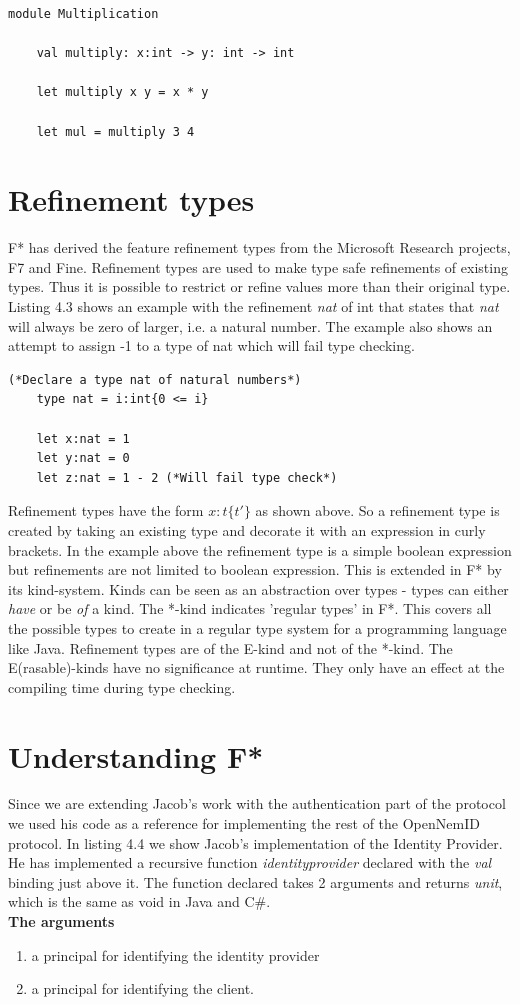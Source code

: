 \documentclass[twosided]{report}
\begin{document}
\begin{lstlisting}[style=fstar, caption={Multiplication example in F*}]
	module Multiplication

	val multiply: x:int -> y: int -> int
	
	let multiply x y = x * y
	
	let mul = multiply 3 4
\end{lstlisting}

\section{Refinement types}
F* has derived the feature refinement types from the Microsoft Research projects, F7 and Fine. Refinement types are used to make type safe refinements of existing types. Thus it is possible to restrict or refine values more than their original type. Listing 4.3 shows an example with the refinement \emph{nat} of int that states that \emph{nat} will always be zero of larger, i.e. a natural number. The example also shows an attempt to assign -1 to a type of nat which will fail type checking.
\begin{lstlisting}[style=fstar, caption={Simple refinement types in F*}]
	(*Declare a type nat of natural numbers*)	
	type nat = i:int{0 <= i}
	
	let x:nat = 1
	let y:nat = 0
	let z:nat = 1 - 2 (*Will fail type check*)
\end{lstlisting}

Refinement types have the form $x:t\{t'\}$ as shown above. So a refinement type is created by taking an existing type and decorate it with an expression in curly brackets. In the example above the refinement type is a simple boolean expression but refinements are not limited to boolean expression. This is extended in F* by its kind-system. Kinds can be seen as an abstraction over types - types can either \emph{have} or be \emph{of} a kind. The *-kind indicates 'regular types' in F*. This covers all the possible types to create in a regular type system for a programming language like Java. Refinement types are of the E-kind and not of the *-kind. The E(rasable)-kinds have no significance at runtime. They only have an effect at the compiling time during type checking.

\section{Understanding F*}
Since we are extending Jacob's work with the authentication part of the protocol we used his code as a reference for implementing the rest of the OpenNemID protocol. In listing 4.4 we show Jacob's implementation of the Identity Provider. He has implemented a recursive function \emph{identityprovider} declared with the \emph{val} binding just above it. The function declared takes 2 arguments and returns \emph{unit}, which is the same as void in Java and C\#.\\
\textbf{The arguments}
\begin{enumerate}
\item a principal for identifying the identity provider
\item a principal for identifying the client.
\end{enumerate}
\end{document}

